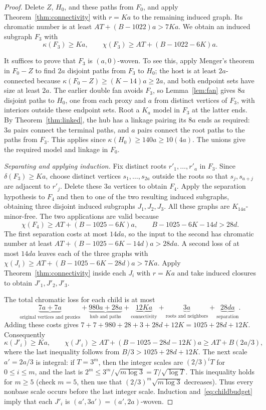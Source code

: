 \documentclass[11pt]{article}
\begin{document}
\begin{proof}
Delete $Z$, $H_0$, and these paths from $F_0$, and apply
Theorem~\ref{thm:connectivity} with $r=Ka$ to the remaining induced
graph. Its chromatic number is at least $AT+(B-1022)a>7Ka$.
We obtain an induced subgraph $F_3$ with
\[
 \kappa(F_3)\ge Ka,\qquad
 \chi(F_3)\ge AT+(B-1022-6K)a.
\]

It suffices to prove that $F_3$ is $(a,0)$-woven. To see this, apply
Menger's theorem in $F_0-Z$ to find $2a$ disjoint paths
from $F_3$ to $H_0$; the host is at least $2a$-connected because
$\kappa(F_0-Z)\ge(K-14)a\ge2a$, and both
endpoint sets have size at least $2a$. The earlier double fan avoids
$F_3$, so Lemma~\ref{lem:fan} gives $8a$ disjoint paths to $H_0$,
one from each proxy and $a$ from distinct vertices of $F_3$, with
interiors outside these endpoint sets. Root a $K_a$ model in $F_3$
at the latter ends. By Theorem~\ref{thm:linked}, the hub has a
linkage pairing its $8a$ ends as required: $3a$ pairs connect the
terminal paths, and $a$ pairs connect the root paths to the paths
from $F_3$. This applies since $\kappa(H_0)\ge140a\ge10(4a)$.
The unions give the required model and linkage in $F_0$.

\medskip\noindent\emph{Separating and applying induction.}
Fix distinct roots $r'_1,\ldots,r'_a$ in $F_3$. Since
$\delta(F_3)\ge Ka$, choose distinct vertices $s_1,\ldots,s_{2a}$
outside the roots so that $s_j,s_{a+j}$ are adjacent to $r'_j$.
Delete these $3a$ vertices to obtain $F_4$. Apply the separation
hypothesis to $F_4$ and then to one of the two resulting induced
subgraphs, obtaining three disjoint induced subgraphs $J_1,J_2,J_3$.
All these graphs are $K_{14a}$-minor-free. The two applications
are valid because
\[
 \chi(F_4)\ge AT+(B-1025-6K)a,
 \qquad B-1025-6K-14d>28d.
\]
The first separation costs at most $14da$, so the input to the
second has chromatic number at least
$AT+(B-1025-6K-14d)a>28da$. A second loss of at most $14da$
leaves each of the three graphs with
$\chi(J_i)\ge AT+(B-1025-6K-28d)a>7Ka$.
Apply Theorem~\ref{thm:connectivity} inside each $J_i$ with $r=Ka$
and take induced closures to obtain $J'_1,J'_2,J'_3$.

The total chromatic loss for each child is at most
\[
 \underbrace{7a+7a}_{\text{original vertices and proxies}}
 +\underbrace{980a+28a}_{\text{hub and paths}}
 +\underbrace{12Ka}_{\text{connectivity}}
 +\underbrace{3a}_{\text{roots and neighbors}}
 +\underbrace{28da}_{\text{separation}}.
\]
Adding these costs gives
$7+7+980+28+3+28d+12K=1025+28d+12K$.
Consequently
\begin{equation}\label{eq:childbudget}
 \kappa(J'_i)\ge Ka,\qquad
 \chi(J'_i)\ge AT+(B-1025-28d-12K)a
             \ge AT+B(2a/3),
\end{equation}
where the last inequality follows from $B/3>1025+28d+12K$.
The next scale $a'=2a/3$ is integral: if $T=3^m$, then the integer
scales are $(2/3)^iT$ for $0\le i\le m$, and the last is
$2^m\le3^m/\sqrt{m\log3}=T/\sqrt{\log T}$.
This inequality holds for $m\ge5$ (check $m=5$, then use that
$(2/3)^m\sqrt{m\log3}$ decreases). Thus every nonbase scale
occurs before the last integer scale. Induction and~\eqref{eq:childbudget} imply that each
$J'_i$ is $(a',3a')=(a',2a)$-woven.


\end{proof}
\end{document}
